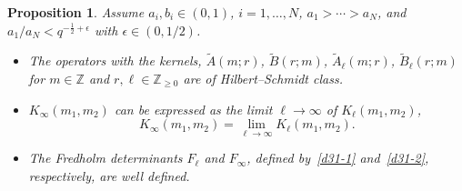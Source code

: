 \documentclass[pdftex]{sigma}
\numberwithin{equation}{section}
\newtheorem{Proposition}[Theorem]{Proposition}
 { \theoremstyle{definition}
\newtheorem{Definition}[Theorem]{Definition}
\newtheorem{Note}[Theorem]{Note}
\newtheorem{Example}[Theorem]{Example}
\newtheorem{Remark}[Theorem]{Remark} }
\def\e{\epsilon}
\def\i{\infty}
\def\Z{\mathbb{Z}}
\begin{document}
\begin{Proposition}\label{p33}
Assume $a_i,b_i\in(0,1)$, $i=1,\dots,N$, $a_1>\cdots>a_N$, and $a_{1}/a_{N}<q^{-\frac12+\e}$ with $\e\in(0,1/2)$.
\begin{itemize}\itemsep=0pt
 \item[{\rm (i)}]
The operators with
the kernels, $\tilde{A}(m;r)$, $\tilde{B}(r;m)$,
$\tilde{A}_\ell(m;r)$, $\tilde{B}_\ell(r;m)$
for $m\in\Z$ and $r,\ell\in\Z_{\ge 0}$
are of Hilbert--Schmidt class.
 \item[{\rm (ii)}] $K_{\i}(m_1,m_2)$
 can be expressed as the limit $\ell\rightarrow\i$ of $K_{\ell}(m_1,m_2)$,
 \begin{equation}
 \label{p33-1}
 K_{\i}(m_1,m_2)=\lim_{\ell\rightarrow\i}K_\ell(m_1,m_2).
 \end{equation}
 \item[{\rm (iii)}]
 The Fredholm determinants $F_\ell $ and $F_{\infty}$, defined by~\eqref{d31-1} and~\eqref{d31-2}, respectively, are well defined.
\end{itemize}
\end{Proposition}
\end{document}
